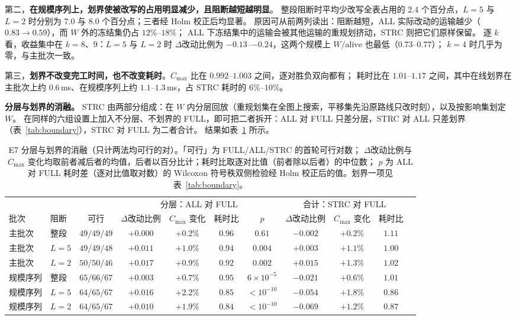 \documentclass[manuscript,screen,review]{acmart}
\providecommand{\STRC}{\textsc{STRC}}
\begin{document}
第二，\textbf{在规模序列上，划界使被改写的占用明显减少，且阻断越短越明显}。
整段阻断时平均少改写全表占用的 \(2.4\) 个百分点，\(L=5\) 与 \(L=2\) 时分别为 \(7.0\) 与 \(8.0\) 个百分点；三者经 Holm 校正后均显著。
原因可从前两列读出：阻断越短，ALL 实际改动的运输越少（\(0.83\to0.59\)），而 \(W\) 外的冻结集仍占 \(12\%\)--\(18\%\)；
ALL 下冻结集中的运输会被其他运输的重规划挤动，\STRC{} 则把它们原样保留。
逐 \(k\) 看，收益集中在 \(k=8\)、\(9\)：\(L=5\) 与 \(L=2\) 时 \(\Delta\)改动比例为 \(-0.13\)--\(-0.24\)，这两个规模上 \(W/\mathrm{alive}\) 也最低（\(0.73\)--\(0.77\)）；
\(k=4\) 时几乎为零，与主批次一致。

第三，\textbf{划界不改变完工时间，也不改变耗时}。\(C_{\max}\) 比在 \(0.992\)--\(1.003\) 之间，逐对胜负双向都有；
耗时比在 \(1.01\)--\(1.17\) 之间，其中在线划界在主批次上约 \(0.6\)\,ms、在规模序列上约 \(1.1\)--\(1.3\)\,ms，占 \STRC{} 耗时的 \(6\%\)--\(10\%\)。

\textbf{分层与划界的消融。}
\STRC{} 由两部分组成：在 \(W\) 内分层回放（重规划集在全图上搜索，平移集先沿原路线只改时刻），以及按影响集划定 \(W\)。
在同样的六组设置上加入不分层、不划界的 FULL，即可把二者拆开：ALL 对 FULL 只差分层，\STRC{} 对 ALL 只差划界（表~\ref{tab:boundary}），\STRC{} 对 FULL 为二者合计。
结果如表~\ref{tab:ablation} 所示。

\begin{table}[t]
\centering
\caption{E7 分层与划界的消融（只计两法均可行的对）。「可行」为 FULL/ALL/\STRC{} 的首轮可行对数；
\(\Delta\)改动比例与 \(C_{\max}\) 变化均取前者减后者的均值，后者以百分比计；耗时比取逐对比值（前者除以后者）的中位数；
\(p\) 为 ALL 对 FULL 耗时差（逐对比值取对数）的 Wilcoxon 符号秩双侧检验经 Holm 校正后的值。划界一项见表~\ref{tab:boundary}。}
\label{tab:ablation}
\small
\setlength{\tabcolsep}{3pt}
\begin{tabular}{@{}llccccccccc@{}}
\toprule
 & & & \multicolumn{4}{c}{分层：ALL 对 FULL} & \multicolumn{3}{c}{合计：\STRC{} 对 FULL} \\
\cmidrule(lr){4-7}\cmidrule(l){8-10}
批次 & 阻断 & 可行 & \(\Delta\)改动比例 & \(C_{\max}\) 变化 & 耗时比 & \(p\) & \(\Delta\)改动比例 & \(C_{\max}\) 变化 & 耗时比 \\
\midrule
主批次 & 整段 & \(49/49/49\) & \(+0.000\) & \(+0.2\%\) & \(0.96\) & \(0.61\) & \(-0.002\) & \(+0.2\%\) & \(1.11\) \\
主批次 & \(L=5\) & \(49/49/48\) & \(+0.011\) & \(+1.0\%\) & \(0.94\) & \(0.004\) & \(+0.003\) & \(+1.1\%\) & \(1.00\) \\
主批次 & \(L=2\) & \(50/50/46\) & \(+0.017\) & \(+0.9\%\) & \(0.92\) & \(0.002\) & \(+0.015\) & \(+1.3\%\) & \(1.02\) \\
\addlinespace[2pt]
规模序列 & 整段 & \(65/66/67\) & \(+0.003\) & \(+0.7\%\) & \(0.95\) & \(6\times10^{-5}\) & \(-0.021\) & \(+0.6\%\) & \(1.01\) \\
规模序列 & \(L=5\) & \(64/65/67\) & \(+0.016\) & \(+2.2\%\) & \(0.85\) & \(<10^{-10}\) & \(-0.054\) & \(+1.8\%\) & \(0.86\) \\
规模序列 & \(L=2\) & \(64/65/67\) & \(+0.010\) & \(+1.9\%\) & \(0.84\) & \(<10^{-10}\) & \(-0.069\) & \(+1.2\%\) & \(0.87\) \\
\bottomrule
\end{tabular}
\end{table}
\end{document}
